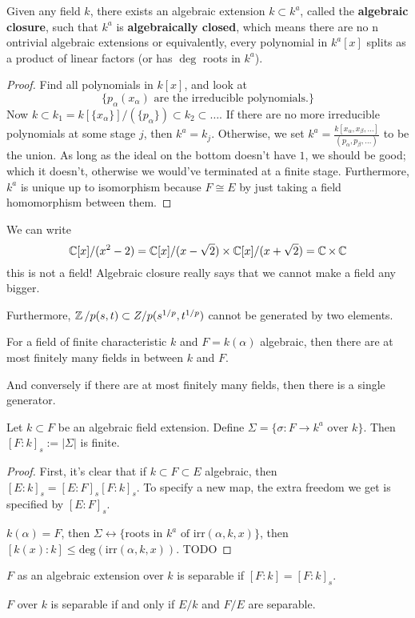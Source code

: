 \begin{theorem}
    Given any field $k$,
    there exists an algebraic extension $k \subset k^a$,
    called the \textbf{algebraic closure}, 
    such that $k^a$ is \textbf{algebraically closed},
    which means there are no n
    ontrivial algebraic extensions or equivalently,
    every polynomial in $k^a[x]$ splits 
    as a product of linear factors (or has $\deg$ roots in $k^a$).

    \begin{proof}
        Find all polynomials in $k[x]$, and look at
        \[ \{ p_{\alpha}(x_{\alpha}) \text{ are the irreducible polynomials.} \}\]
        Now $k \subset k_1 = k[\{x_{\alpha}\}]/(\{p_{\alpha}\}) \subset k_2 \subset \dots$.
        If there are no more irreducible polynomials at some stage $j$, then $k^a = k_j$.
        Otherwise, we set $k^a = \frac{k[x_{\alpha}, x_{\beta}, \dots]}{(p_{\alpha}, p_{\beta}, \dots)}$
        to be the union.
        As long as the ideal on the bottom doesn't have $1$,
        we should be good; which it doesn't, otherwise we would've terminated at a finite stage.
        Furthermore, $k^a$ is unique up to isomorphism because $F \cong E$ by just taking
        a field homomorphism between them.
    \end{proof}
\end{theorem}
We can write
\[ \operatorname{\mathbb{C}}[x]/(x^2 - 2) = \operatorname{\mathbb{C}}[x]/(x-\sqrt{2}) \times \operatorname{\mathbb{C}}[x]/(x + \sqrt{2}) = \operatorname{\mathbb{C}} \times \operatorname{\mathbb{C}} \]
this is not a field! Algebraic closure really says that we cannot make a field any bigger.

Furthermore, $\operatorname{\mathbb{Z}}/p(s, t) \subset Z/p(s^{1/p}, t^{1/p})$
cannot be generated by two elements.

\begin{theorem}
For a field of finite characteristic $k$ and
$F = k(\alpha)$ algebraic, then there are at most finitely many fields
in between $k$ and $F$.

And conversely if there are at most finitely many fields, then
there is a single generator.
\end{theorem}

\begin{theorem}
Let $k \subset F$ be an algebraic field extension.
Define $\Sigma = \{ \sigma: F \to k^a \text{ over } k \}$.
Then $[F: k]_s := |\Sigma|$ is finite.
\begin{proof}
    First, it's clear that if $k \subset F \subset E$ algebraic,
    then $[E: k]_s = [E: F]_s [F: k]_s$.
    To specify a new map, the extra freedom we get is specified
    by $[E: F]_s$.

    $k(\alpha) = F$, then $\Sigma \leftrightarrow \{\text{roots in } k^a \text{ of } \text{irr}(\alpha, k, x)\}$,
    then $[k(x) : k] \le \text{deg}(\text{irr}(\alpha, k, x))$.
    TODO
\end{proof}
\end{theorem}

\begin{definition}
    $F$ as an algebraic extension over $k$ is separable if $[F:k] = [F:k]_s$.
\end{definition}

\begin{theorem}
    $F$ over $k$ is separable if and only if $E/k$ and $F/E$ are separable.
\end{theorem}